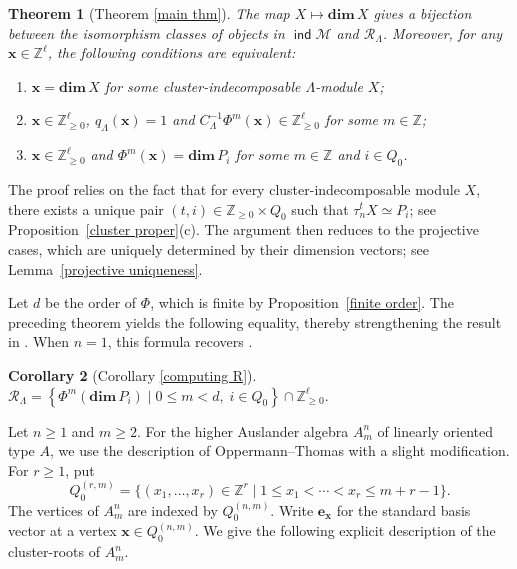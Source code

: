 \documentclass[11pt,a4paper]{amsart}
\newtheorem{theorem}{Theorem}[section]
\newtheorem{corollary}[theorem]{Corollary}
\theoremstyle{definition}
\numberwithin{equation}{section}
\newcommand{\Z}{\mathbb{Z}}
\newcommand{\e}{\mathbf{e}}
\newcommand{\x}{\mathbf{x}}
\newcommand{\0}{\mathbf{0}}
\newcommand{\dimv}{\mathbf{dim}\,}
\DeclareMathOperator{\ind}{\mathsf{ind}}
\begin{document}
	
	\begin{theorem} [Theorem \ref{main thm}] \label{thm1}	The map $X\mapsto \dimv X$ gives a  bijection between
		the isomorphism classes of objects  in $\ind \mathcal{M}$ 
		and $\mathcal R_\Lambda$.  		
		Moreover, for any $\x\in\mathbb Z^\ell$, the following conditions are equivalent:
		\begin{enumerate}
			\item[(a)] $\x=\dimv X$ for some cluster-indecomposable $\Lambda$-module $X$;
			\item[(b)] $\x\in\mathbb Z^\ell_{\geq 0}$, $q_\Lambda(\x)=1$ and $C_{\Lambda}^{-1}\Phi^m(\x)\in\mathbb Z^\ell_{\geq 0}$ for some $m\in \Z $;		
			\item[(c)] $\x\in\mathbb Z^\ell_{\geq 0}$ and $\Phi^m(\x)=\dimv P_i$ for some $m\in \Z$ and $i\in Q_0$.
		\end{enumerate}
	\end{theorem}
	
		The proof relies on the fact that for every cluster-indecomposable module $X$, there exists a unique  pair $(t,i)\in \mathbb Z_{\geq0}\times Q_0$ such that
		$\tau_n^tX\simeq P_i$; see Proposition~\ref{cluster proper}(c). The argument then
	reduces to the projective cases, which  are uniquely determined by their
	dimension vectors; see Lemma~\ref{projective uniqueness}. 
	
	Let $d$ be the order of $\Phi$, which is finite by
	Proposition~\ref{finite order}. 
	The preceding theorem yields the following equality, thereby
	strengthening the result in
	\cite[Theorem~1.3]{Miz}.  When $n=1$, this formula recovers \cite[VII, Proposition~4.14]{ASS}.
	
	\begin{corollary} 	[Corollary \ref{computing R}]
		$
		\mathcal{R}_\Lambda
		=
		\left\{
		\Phi^m(\dimv P_i)
		\mid
		0\leq m<d,\; i\in Q_0
		\right\}
		\cap\Z_{\geq0}^{\ell}.
		$
	\end{corollary}

	
		Let $n\ge1$ and $m\ge 2$. For the higher Auslander algebra $A_m^n$ of linearly oriented
	type $A$, we use the description of 
	Oppermann--Thomas \cite{OT} with a slight modification.
	For $r\ge1$, put
	\[
	Q_0^{(r,m)}
	=
	\{(x_1,\ldots,x_r)\in\Z^r
	\mid 1\le x_1<\cdots<x_r\le m+r-1\}.
	\]
	The vertices of $A_m^n$ are indexed by $Q_0^{(n,m)}$. Write $\e_{\mathbf x}$ for the standard basis vector at a vertex
	$\mathbf x\in Q_0^{(n,m)}$.  	
	We give the following explicit description of the cluster-roots of $A_m^n$.
	
\end{document}
